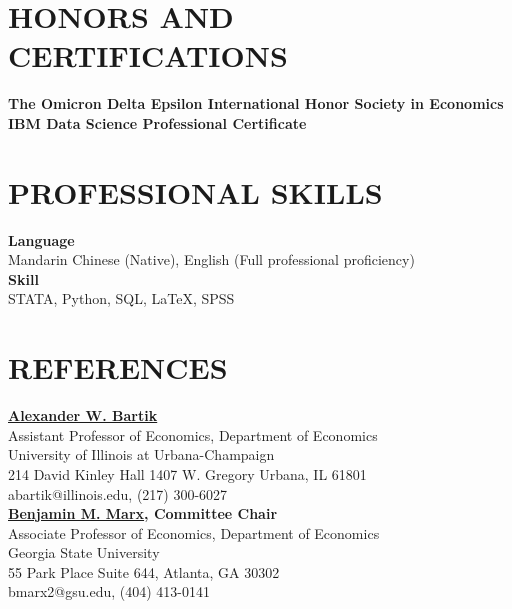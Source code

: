 \documentclass[a4paper,9pt]{extarticle}
\begin{document}

\section*{HONORS AND CERTIFICATIONS}

\noindent
\newline
\textbf{The Omicron Delta Epsilon International Honor Society in Economics} \\

\noindent
\textbf{IBM Data Science Professional Certificate} \\

\section*{PROFESSIONAL SKILLS}

\noindent
\newline
\textbf{Language} \\
Mandarin Chinese (Native), English (Full professional proficiency) \\

\noindent
\textbf{Skill} \\
STATA, Python, SQL, \LaTeX, SPSS \\


\section*{REFERENCES}

\noindent
\textbf{\href{https://www.alexbartik.com}{Alexander W. Bartik}} \\
Assistant Professor of Economics, Department of Economics \\
University of Illinois at Urbana-Champaign \\
214 David Kinley Hall
1407 W. Gregory
Urbana, IL  61801\\
abartik@illinois.edu, (217) 300-6027 \\

\noindent
\newline
\textbf{\href{https://sites.google.com/site/benjaminmmarx/}{Benjamin M. Marx}, Committee Chair} \\
Associate Professor of Economics, Department of Economics \\
Georgia State University \\
55 Park Place Suite 644,
Atlanta, GA 30302\\
bmarx2@gsu.edu, (404) 413-0141 \\
\end{document}
